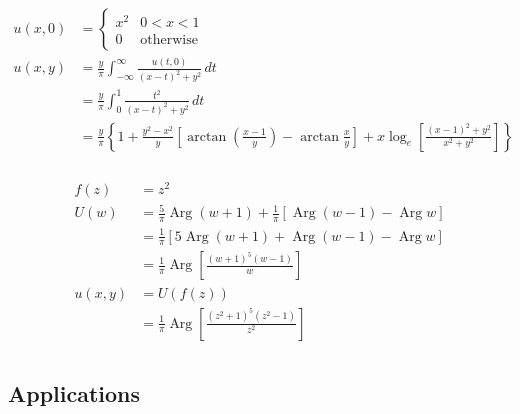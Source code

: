 \documentclass{article}
\newcommand{\Arg}{\operatorname{Arg}}
\begin{document}
\begin{align*}
  u(x, 0) & = \begin{cases}
                x^2 & 0 < x < 1        \\
                0   & \text{otherwise}
              \end{cases}                                                                                                                                                                         \\
  u(x, y) & = \frac{y}{\pi} \int_{-\infty}^\infty \frac{u(t, 0)}{(x - t)^2 + y^2} \,d t                                                                                                                      \\
          & = \frac{y}{\pi} \int_0^1 \frac{t^2}{(x - t)^2 + y^2} \,d t                                                                                                                                       \\
          & = \frac{y}{\pi} \left\{ 1 + \frac{y^2 - x^2}{y} \left[ \arctan \left( \frac{x - 1}{y} \right) - \arctan \frac{x}{y} \right] + x \log_e \left[ \frac{(x - 1)^2 + y^2}{x^2 + y^2} \right] \right\}
\end{align*}

\setcounter{subsubsection}{6}
\subsubsection{}

\begin{align*}
  f(z)    & = z^2                                                                 \\
  U(w)    & = \frac{5}{\pi} \Arg (w + 1) + \frac{1}{\pi} [\Arg (w - 1) - \Arg w]  \\
          & = \frac{1}{\pi} [5 \Arg (w + 1) + \Arg (w - 1) - \Arg w]              \\
          & = \frac{1}{\pi} \Arg \left[ \frac{(w + 1)^5 (w - 1)}{w} \right]       \\
  u(x, y) & = U(f(z))                                                             \\
          & = \frac{1}{\pi} \Arg \left[ \frac{(z^2 + 1)^5 (z^2 - 1)}{z^2} \right] \\
\end{align*}

\subsection{Applications}
\end{document}
